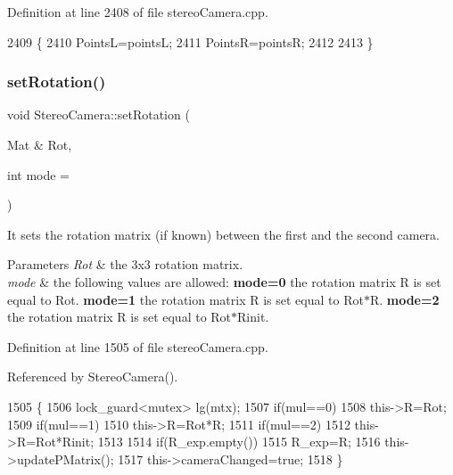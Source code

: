 Definition at line 2408 of file stereo\+Camera.\+cpp.


\begin{DoxyCode}
2409 \{
2410     PointsL=pointsL;
2411     PointsR=pointsR;
2412 
2413 \}
\end{DoxyCode}
\mbox{\label{classStereoCamera_a1329b3894d527e1505618f57a1304624}} 
\subsubsection{\texorpdfstring{set\+Rotation()}{setRotation()}}
{\footnotesize\ttfamily void Stereo\+Camera\+::set\+Rotation (\begin{DoxyParamCaption}\item[{Mat \&}]{Rot,  }\item[{int}]{mode = {} }\end{DoxyParamCaption})}



It sets the rotation matrix (if known) between the first and the second camera. 


\begin{DoxyParams}{Parameters}
{\em Rot} & the 3x3 rotation matrix. \\
\hline
{\em mode} & the following values are allowed\+: {\bfseries mode=0} the rotation matrix R is set equal to Rot. {\bfseries mode=1} the rotation matrix R is set equal to Rot$\ast$R. {\bfseries mode=2} the rotation matrix R is set equal to Rot$\ast$\+Rinit. \\
\hline
\end{DoxyParams}


Definition at line 1505 of file stereo\+Camera.\+cpp.



Referenced by Stereo\+Camera().


\begin{DoxyCode}
1505                                                 \{
1506     lock\_guard<mutex> lg(mtx);
1507     \textcolor{keywordflow}{if}(mul==0)
1508         this->R=Rot;
1509     \textcolor{keywordflow}{if}(mul==1)
1510         this->R=Rot*R;
1511     \textcolor{keywordflow}{if}(mul==2)
1512         this->R=Rot*Rinit;
1513 
1514     \textcolor{keywordflow}{if}(R\_exp.empty())
1515         R\_exp=R;
1516     this->updatePMatrix();
1517     this->cameraChanged=\textcolor{keyword}{true};
1518 \}
\end{DoxyCode}
\mbox{\label{classStereoCamera_a7b10f1218e8e70f47b22080ba1820d39}} 
